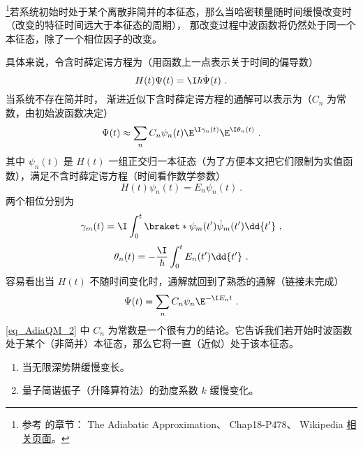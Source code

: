 
\begin{issues}
\issueTODO
\end{issues}

\footnote{参考 \cite{GriffE} 的章节： The Adiabatic Approximation、 \cite{Shankar} Chap18-P478、 Wikipedia \href{https://en.wikipedia.org/wiki/Adiabatic_theorem}{相关页面}。}若系统初始时处于某个离散非简并的本征态，那么当哈密顿量随时间缓慢改变时（改变的特征时间远大于本征态的周期）， 那改变过程中波函数将仍然处于同一个本征态，除了一个相位因子的改变。

具体来说，令含时薛定谔方程为（用函数上一点表示关于时间的偏导数）
\begin{equation}
H(t)\Psi(t) = \I\hbar\dot\Psi(t)~.
\end{equation}
当系统不存在简并时， 渐进近似下含时薛定谔方程的通解可以表示为（$C_n$ 为常数，由初始波函数决定）
\begin{equation}\label{eq_AdiaQM_2}
\Psi(t) \approx \sum_n C_n \psi_n(t) \E^{\I\gamma_n(t)}\E^{\I\theta_n(t)}~.
\end{equation}
其中 $\psi_n(t)$ 是 $H(t)$ 一组正交归一本征态（为了方便本文把它们限制为实值函数），满足不含时薛定谔方程（时间看作数学参数）
\begin{equation}
H(t)\psi_n(t) = E_n\psi_n(t)~.
\end{equation}
两个相位分别为
\begin{equation}
\gamma_m(t) = \I \int_0^t \braket*{\psi_m(t')}{\dot\psi_m(t')}\dd{t'}~,
\end{equation}
\begin{equation}
\theta_n(t) = -\frac{\I}{\hbar} \int_0^t E_n(t')\dd{t'}~.
\end{equation}
容易看出当 $H(t)$ 不随时间变化时，通解就回到了熟悉的通解（链接未完成）
\begin{equation}
\Psi(t) = \sum_n C_n \psi_n \E^{-\I E_n t}~.
\end{equation}
\autoref{eq_AdiaQM_2} 中 $C_n$ 为常数是一个很有力的结论。它告诉我们若开始时波函数处于某个（非简并）本征态，那么它将一直（近似）处于该本征态。

\begin{example}{}
\begin{enumerate}
\item 当无限深势阱缓慢变长。
\item 量子简谐振子（升降算符法）的劲度系数 $k$ 缓慢变化。
\end{enumerate}
\end{example}

